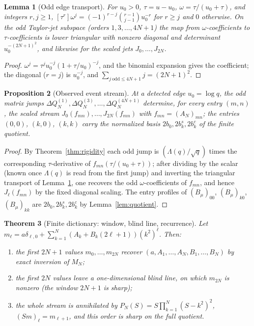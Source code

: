 \documentclass[11pt]{article}
\theoremstyle{plain}
\newtheorem{theorem}{Theorem}[section]
\newtheorem{proposition}[theorem]{Proposition}
\newtheorem{lemma}[theorem]{Lemma}
\theoremstyle{definition}
\theoremstyle{remark}
\newcommand{\Lam}{\Lambda}
\begin{document}
\begin{lemma}[Odd edge transport]\label{lem:transport}
For $u_0>0$, $\tau=u-u_0$, $\omega=\tau/(u_0+\tau)$, and integers $r,j\ge1$,
$[\tau^r]\omega^j=(-1)^{r-j}\binom{r-1}{j-1}u_0^{-r}$ for $r\ge j$ and $0$
otherwise. On the odd Taylor-jet subspace (orders $1,3,\dots,4N+1$) the map from
$\omega$-coefficients to $\tau$-coefficients is lower triangular with nonzero
diagonal and determinant $u_0^{-(2N+1)^2}$, and likewise for the scaled jets
$J_0,\dots,J_{2N}$.
\end{lemma}

\begin{proof}
$\omega^j=\tau^ju_0^{-j}(1+\tau/u_0)^{-j}$, and the binomial expansion gives the
coefficient; the diagonal ($r=j$) is $u_0^{-j}$, and
$\sum_{j\ \mathrm{odd}\le 4N+1}j=(2N+1)^2$.
\end{proof}

\begin{proposition}[Observed event stream]\label{prop:stream}
At a detected edge $u_0=\log q$, the odd matrix jumps $\Delta Q_N^{(1)},
\Delta Q_N^{(3)},\dots,\Delta Q_N^{(4N+1)}$ determine, for every entry
$(m,n)$, the scaled stream $J_0(f_{mn}),\dots,J_{2N}(f_{mn})$ with
$f_{mn}=(A_N)_{mn}$; the entries $(0,0)$, $(k,0)$, $(k,k)$ carry the normalized
basis $2b_0,2b_k^s,2b_k^c$ of the finite quotient.
\end{proposition}

\begin{proof}
By Theorem~\ref{thm:rigidity} each odd jump is $(\Lam(q)/\sqrt q)$ times the
corresponding $\tau$-derivative of $f_{mn}(\tau/(u_0+\tau))$; after dividing by
the scalar (known once $\Lam(q)$ is read from the first jump) and inverting the
triangular transport of Lemma~\ref{lem:transport}, one recovers the odd
$\omega$-coefficients of $f_{mn}$, and hence $J_\ell(f_{mn})$ by the fixed
diagonal scaling. The entry profiles of $(B_\mu)_{00}$, $(B_\mu)_{k0}$,
$(B_\mu)_{kk}$ are $2b_0,2b_k^s,2b_k^c$ by Lemma~\ref{lem:quotient}.
\end{proof}

\begin{theorem}[Finite dictionary: window, blind line, recurrence]\label{thm:dictionary}
Let $m_\ell=a\delta_{\ell,0}+\sum_{k=1}^N(A_k+B_k(2\ell+1))(k^2)^\ell$. Then:
\begin{enumerate}
\item[(i)] the first $2N+1$ values $m_0,\dots,m_{2N}$ recover
$(a,A_1,\dots,A_N,B_1,\dots,B_N)$ by exact inversion of $M_N$;
\item[(ii)] the first $2N$ values leave a one-dimensional blind line, on which
$m_{2N}$ is nonzero (the window $2N{+}1$ is sharp);
\item[(iii)] the whole stream is annihilated by
$P_N(S)=S\prod_{k=1}^N(S-k^2)^2$, $(Sm)_\ell=m_{\ell+1}$, and this order is sharp
on the full quotient.
\end{enumerate}
\end{theorem}
\end{document}
